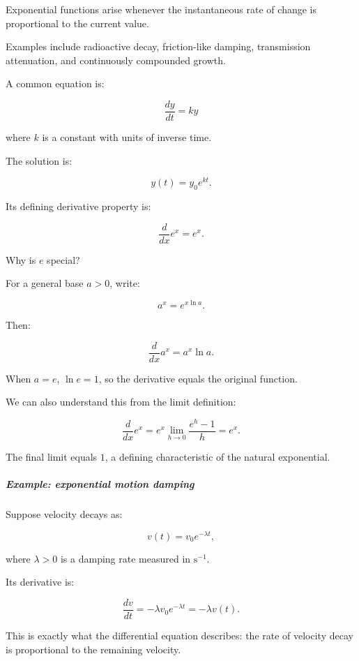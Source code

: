 \hypertarget{01-foundations-i-ch020-exponential-functions}{}

Exponential functions arise whenever the instantaneous rate of change is proportional to the current value.

Examples include radioactive decay, friction-like damping, transmission attenuation, and continuously compounded growth.

A common equation is:

\[
\frac{dy}{dt}=ky
\]

where \(k\) is a constant with units of inverse time.

The solution is:

\[
y(t)=y_0e^{kt}.
\]

Its defining derivative property is:

\[
\boxed{\frac d{dx}e^x=e^x}.
\]

Why is \(e\) special?

For a general base \(a>0\), write:

\[
a^x=e^{x\ln a}.
\]

Then:

\[
\boxed{\frac d{dx}a^x=a^x\ln a}.
\]

When \(a=e\), \(\ln e=1\), so the derivative equals the original function.

We can also understand this from the limit definition:

\[
\frac d{dx}e^x =e^x\lim_{h\to0}\frac{e^h-1}{h} =e^x.
\]

The final limit equals \(1\), a defining characteristic of the natural exponential.

\begin{allmightroleexample}

\subparagraph{Example: exponential motion damping}\label{01-foundations-i-ch020-example-exponential-motion-damping}

\hypertarget{01-foundations-i-ch020-example-exponential-motion-damping}{}

Suppose velocity decays as:

\end{allmightroleexample}

\[
v(t)=v_0e^{-\lambda t},
\]

where \(\lambda>0\) is a damping rate measured in \(\mathrm{s}^{-1}\).

Its derivative is:

\[
\frac{dv}{dt}=-\lambda v_0e^{-\lambda t} =-\lambda v(t).
\]

This is exactly what the differential equation describes: the rate of velocity decay is proportional to the remaining velocity.

